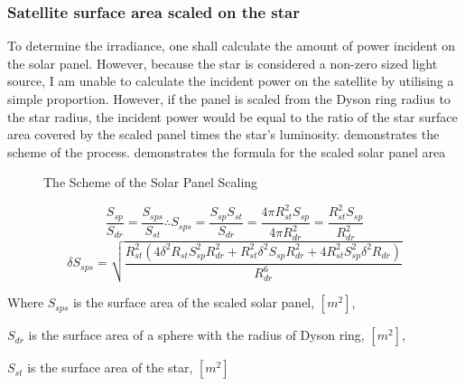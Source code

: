 \documentclass[stu, 11pt, a4paper, floatsintext, noextraspace]{apa7}
\begin{document}
	\subsubsection{Satellite surface area scaled on the star}
	To determine the irradiance, one shall calculate the amount of power incident on the solar panel. However, because the star is considered a non-zero sized light source, I am unable to calculate the incident power on the satellite by utilising a simple proportion. However, if the panel is scaled from the Dyson ring radius to the star radius, the incident power would be equal to the ratio of the star surface area covered by the scaled panel times the star's luminosity.  demonstrates the scheme of the process.  demonstrates the formula for the scaled solar panel area
	\begin{figure}[h!]
		\centering
		\caption{The Scheme of the Solar Panel Scaling}
		\label{fig5:solar_panel_scaling}
	\end{figure}
	\begin{equation}
		\label{eq9:solar_panel_area_scaled}
		\frac{S_{sp}}{S_{dr}} = \frac{S_{sps}}{S_{st}} \therefore S_{sps} = \frac{S_{sp}S_{st}}{S_{dr}} = \frac{4\pi R^2_{st}S_{sp}}{4\pi R^2_{dr}}=\frac{R^2_{st}S_{sp}}{R^2_{dr}}
	\end{equation}
	\begin{equation*}
		\delta S_{sps}=\sqrt{\frac{R_{st}^2\left(4\delta^2R_{st}S_{sp}^2R_{dr}^2+R_{st}^2\delta^2S_{sp}R_{dr}^2+4R_{st}^2S_{sp}^2\delta^2R_{dr}\right)}{R_{dr}^6}}
	\end{equation*}
	\begin{center}
		Where $S_{sps}$ is the surface area of the scaled solar panel, $[m^2]$,
		
		$S_{dr}$ is the surface area of a sphere with the radius of Dyson ring, $[m^2]$,
		
		$S_{st}$ is the surface area of the star, $[m^2]$
	\end{center}
\end{document}
